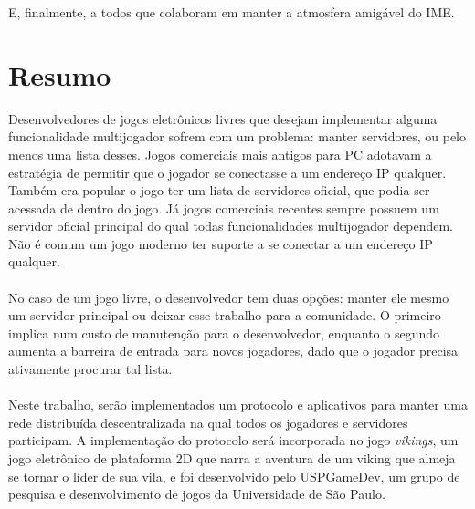 \documentclass[11pt,twoside,a4paper]{book}
\begin{document}
E, finalmente, a todos que colaboram em manter a atmosfera amigável do IME.


\chapter*{Resumo}

Desenvolvedores de jogos eletrônicos livres que desejam implementar alguma
funcionalidade multijogador sofrem com um problema: manter servidores, ou pelo
menos uma lista desses. Jogos comerciais mais antigos para PC adotavam a
estratégia de permitir que o jogador se conectasse a um endereço IP qualquer.
Também era popular o jogo ter um lista de servidores oficial, que podia ser
acessada de dentro do jogo. Já jogos comerciais recentes sempre possuem um
servidor oficial principal do qual todas funcionalidades multijogador dependem.
Não é comum um jogo moderno ter suporte a se conectar a um endereço IP qualquer.
\\
\\
No caso de um jogo livre, o desenvolvedor tem duas opções: manter ele mesmo um
servidor principal ou deixar esse trabalho para a comunidade. O primeiro implica
num custo de manutenção para o desenvolvedor, enquanto o segundo aumenta a
barreira de entrada para novos jogadores, dado que o jogador precisa ativamente
procurar tal lista.
\\
\\
Neste trabalho, serão implementados um protocolo e aplicativos para manter uma
rede distribuída descentralizada na qual todos os jogadores e servidores
participam. A implementação do protocolo será incorporada no jogo \textit{vikings},
um jogo eletrônico de plataforma 2D que narra a aventura de um viking que almeja
se tornar o líder de sua vila, e foi desenvolvido pelo USPGameDev, um grupo de
pesquisa e desenvolvimento de jogos da Universidade de São Paulo.


\def\cyclic#1{\langle #1 \rangle}

\newcommand\definicao[2]{
    \stepcounter{defcnt}
    \vspace{0.5cm}
    \vbox{
    \textbf{Definição \thedefcnt \hspace{1cm} #1} \\ #2
    \begin{center}
        $ \square $
    \end{center}
}
}
\newcommand\notacao{
    \textbf{Notação} \hspace{0.2cm}
}
\end{document}
